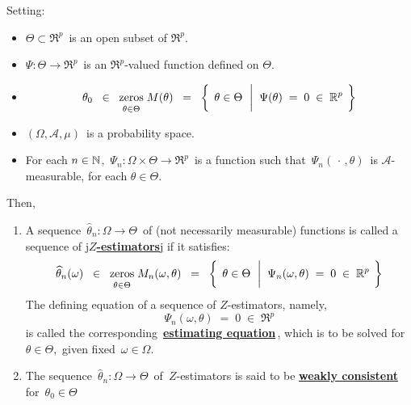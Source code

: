 \begin{definition}[$Z$-Estimators]
\mbox{}
\vskip 0.1cm
\noindent
Setting:
\begin{itemize}
\item
	$\Theta \subset \Re^{p}$\, is an open subset of $\Re^{p}$.
\item
	$\Psi : \Theta \longrightarrow \Re^{p}$\, is an $\Re^{p}$-valued function defined on $\Theta$.
\item
	\begin{equation*}
	\theta_{0}
	\;\; \in \;\;
		\underset{\theta\overset{{\color{white}.}}{\in}\Theta}{\zeros}\; M(\theta)
	\;\; = \;\;
		\left\{\;\,
			\theta \in \Theta
			\,\;\left\vert\;\;
				\overset{{\color{white}1}}{\Psi}(\theta) \;=\; 0 \;\in\; \Re^{p}
				\right.
			\;\right\}
	\end{equation*}
\item
	$(\Omega,\mathcal{A},\mu)$\, is a probability space.
\item
	For each $n \in \mathbb{N}$, \,$\Psi_{n} : \Omega \times \Theta \longrightarrow \Re^{p}$\,
	is a function such that \,$\Psi_{n}(\,\cdot\,,\theta)$\, is $\mathcal{A}$-measurable,
	for each $\theta \in \Theta$.
\end{itemize}
Then,
\begin{enumerate}
\item
	A sequence
	\,$\widehat{\theta}_{n} : \Omega \longrightarrow \Theta$\,
	of (not necessarily measurable) functions
	is called a sequence of \underline{{\color{white}j}\textbf{$Z$-estimators}{\color{white}j}}
	if it satisfies:
	\begin{equation*}
	\widehat{\theta}_{n}(\omega)
	\;\; \in \;\;
		\underset{\theta\overset{{\color{white}.}}{\in}\Theta}{\zeros}\; M_{n}(\omega,\theta)
	\;\; = \;\;
		\left\{\;\,
			\theta \in \Theta
			\,\;\left\vert\;\;
				\overset{{\color{white}1}}{\Psi}_{n}(\omega,\theta) \;=\; 0 \;\in\; \Re^{p}
				\right.
			\;\right\}
	\end{equation*}
	The defining equation of a sequence of $Z$-estimators, namely,
	\begin{equation*}
	\Psi_{n}(\omega,\theta) \;=\; 0 \;\in\; \Re^{p}
	\end{equation*}
	is called the corresponding \,\underline{\textbf{estimating equation}}\,,
	which is to be solved for \,$\theta \in \Theta$,\, given fixed \,$\omega \in \Omega$.\,
\item
	The sequence
	\,$\widehat{\theta}_{n} : \Omega \longrightarrow \Theta$\,
	of \,$Z$-estimators is said to be
	\underline{\textbf{weakly consistent}}\, for \,$\theta_{0} \in \Theta$\,

\end{enumerate}
\end{definition}
